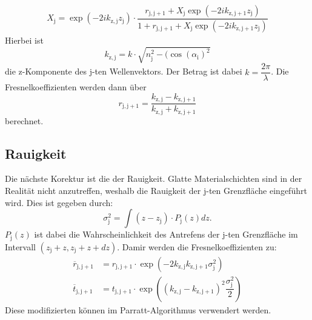 \begin{align}
  \label{eqn:Parratt-Algorithmus}
X_\mathrm{j}= \exp(-2i k_\mathrm{z,j}z_\mathrm{j})\cdot\dfrac{r_\mathrm{j,j+1}+X_\mathrm{j}\exp(-2i k_\mathrm{z,j+1}z_\mathrm{j})}{1+r_\mathrm{j,j+1}+X_\mathrm{j}\exp(-2i k_\mathrm{z,j+1}z_\mathrm{j})}
\end{align}
Hierbei ist
\begin{equation}
  \label{eqn:kzj}
 k_\mathrm{z,j}= k\cdot\sqrt{n_\mathrm{j}^2-(\cos(\alpha_\mathrm{i})^2}
\end{equation}
die z-Komponente des j-ten Wellenvektors. Der Betrag ist dabei $k=\dfrac{2\pi}{\lambda}$. Die Fresnelkoeffizienten werden dann über
\begin{equation}
  \label{eqn:Veränderten Fresnelkoefizienten}
  r_\mathrm{j,j+1}= \dfrac{k_\mathrm{z,j}-k_\mathrm{z,j+1}}{ k_\mathrm{z,j}+ k_\mathrm{z,j+1}}
\end{equation}
berechnet.
\subsection{Rauigkeit}
\label{sec:Rauigkeit}
Die nächste Korektur ist die der Rauigkeit. Glatte Materialschichten sind in der Realität nicht anzutreffen, weshalb die Rauigkeit der j-ten Grenzfläche eingeführt wird. Dies ist gegeben durch:
\begin{equation}
  \label{eqn:rms}
\sigma_\mathrm{j}^2= \int (z-z_\mathrm{j})\cdot P_\mathrm{j}(z) dz.
\end{equation}
$P_\mathrm{j}(z)$ ist dabei die Wahrscheinlichkeit des Antrefens der j-ten Grenzfläche im Intervall $(z_\mathrm{j}+z,z_\mathrm{j}+z+dz)$.
Damir werden die Fresnelkoeffizienten zu:
\begin{align}
  \label{eqn:modkoeff}
  \overline{r}_\mathrm{j,j+1}&=r_\mathrm{j,j+1}\cdot\exp(-2 k_\mathrm{z,j} k_\mathrm{z,j+1}\sigma_\mathrm{j}^2) \\
  \label{eqn:modkoeff2}
  \overline{t}_\mathrm{j,j+1}&=t_\mathrm{j,j+1}\cdot\exp\left(( k_\mathrm{z,j}-k_\mathrm{z,j+1})^2 \dfrac{\sigma_\mathrm{j}^2}{2}\right)
\end{align}
Diese modifizierten können im Parratt-Algorithmus verwendert werden.
